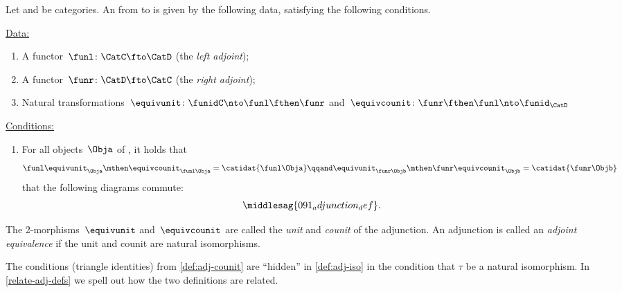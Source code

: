 \begin{ctdefinition}
    \label{def:adj-counit}
    \label{def:cat-adjunction-v2}
    Let \CatC and \CatD be categories.
    An \emph{} from \CatC to \CatD is given by the following data, satisfying the following conditions.

    \underline{Data:}
    \begin{enumerate}
        \item A functor~$\funl \colon \CatC \fto \CatD$ (the \emph{left adjoint});
        \item A functor~$\funr \colon \CatD \fto \CatC$ (the \emph{right adjoint});
        \item Natural transformations~$\equivunit \colon \funidC \nto \funl  \fthen \funr $ and~$\equivcounit\colon \funr \fthen \funl \nto \funid_\CatD$
    \end{enumerate}

    \underline{Conditions:}
    \begin{enumerate}
        \item For all objects~$\Obja$ of \CatC, it holds that
              \begin{equation}
                  \funl \equivunit_\Obja \mthen \equivcounit_{\funl\Obja} = \catidat{\funl\Obja} \qqand
                  \equivunit_{\funr\Objb} \mthen \funr\equivcounit_\Objb = \catidat{\funr\Objb}
              \end{equation}
              \text{\ie } that the following diagrams commute:
              \begin{equation}
                  \middlesag{091_adjunction_def}.
              \end{equation}
    \end{enumerate}

    The 2-morphisms~$\equivunit$ and~$\equivcounit$ are called the \emph{unit} and \emph{counit} of the adjunction.
    An adjunction is called an \emph{adjoint equivalence} if the unit and counit are natural isomorphisms.
\end{ctdefinition}

\begin{remark}
    The conditions (triangle identities) from \cref{def:adj-counit} are ``hidden'' in \cref{def:adj-iso} in the condition that $\tau$ be a natural isomorphism.
    In \cref{relate-adj-defs} we spell out how the two definitions are related.
\end{remark}
